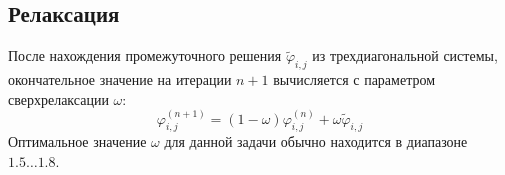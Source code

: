 	\subsection{Релаксация}
	
	После нахождения промежуточного решения $\tilde{\varphi}_{i,j}$ из трехдиагональной системы, окончательное значение на итерации $n+1$ вычисляется с параметром сверхрелаксации $\omega$:
	\begin{equation}
		\varphi_{i,j}^{(n+1)} = (1 - \omega) \varphi_{i,j}^{(n)} + \omega \tilde{\varphi}_{i,j}
	\end{equation}
	Оптимальное значение $\omega$ для данной задачи обычно находится в диапазоне $1.5 \dots 1.8$.
